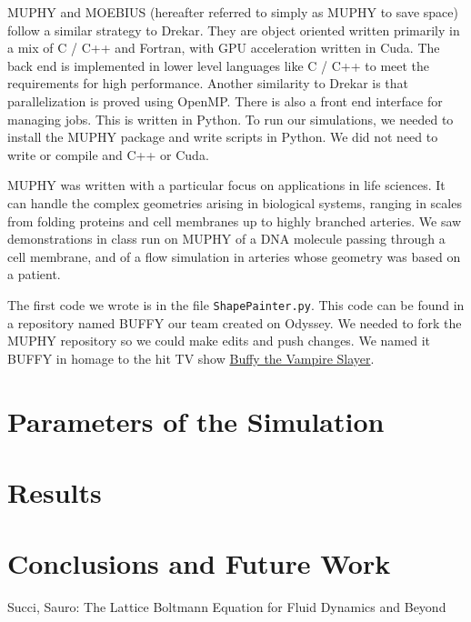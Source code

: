 \documentclass[11pt]{article} %
\newcommand{\tty}[1]{\texttt{#1}}
\begin{document}
MUPHY and MOEBIUS (hereafter referred to simply as MUPHY to save space) follow a similar strategy to Drekar.  
They are object oriented written primarily in a mix of C / C++ and Fortran, with GPU acceleration written in Cuda.
The back end is implemented in lower level languages like C / C++  to meet the requirements for high performance.
Another similarity to Drekar is that parallelization is proved using OpenMP.
There is also a front end interface for managing jobs.  This is written in Python.
To run our simulations, we needed to install the MUPHY package and write
scripts in Python.  We did not need to write or compile and C++ or Cuda.

MUPHY was written with a particular focus on applications in life sciences.
It can handle the complex geometries arising in biological systems, ranging in scales
from folding proteins and cell membranes up to highly branched arteries.
We saw demonstrations in class run on MUPHY of a DNA molecule passing through
a cell membrane, and of a flow simulation in arteries whose geometry was
based on a patient.

The first code we wrote is in the file \tty{ShapePainter.py}.
This code can be found in a repository named BUFFY our team created on Odyssey.
We needed to fork the MUPHY repository so we could make edits and push changes.
We named it BUFFY in homage to the hit TV show 
\href{https://en.wikipedia.org/wiki/Buffy_the_Vampire_Slayer}{Buffy the Vampire Slayer}.

\section{Parameters of the Simulation}

\section{Results}

\section{Conclusions and Future Work}


\begin{thebibliography}{9}
Succi, Sauro: The Lattice Boltmann Equation for Fluid Dynamics and Beyond

\end{thebibliography}
\end{document}
